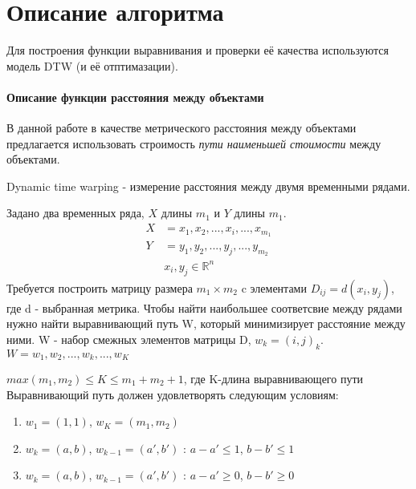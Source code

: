 \documentclass[12pt,twoside]{article}
\begin{document}
    \section{Описание алгоритма}
        Для построения функции выравнивания и проверки её качества используются модель DTW (и её отптимазации).
    \paragraph{Описание функции расстояния между объектами}
        В данной работе в качестве метрического расстояния между объектами предлагается использовать строимость
        \textit{пути наименьшей стоимости} между объектами.
            
        Dynamic time warping - измерение расстояния между двумя временными рядами.
            
        Задано два временных ряда, $X$ длины $m_1$ и $Y$ длины $m_1$.
            \begin{align*}
                X &= x_1,x_2, ..., x_i, ..., x_{m_1} \\
                Y &= y_1,y_2, ..., y_j, ..., y_{m_2} \\
                & x_i, y_j \in \mathbb{R}^n
            \end{align*}
        Требуется построить матрицу размера $m_1\times m_2$ c элементами $D_{ij}=d(x_i, y_j)$, где d - выбранная метрика.
        Чтобы найти наибольшее соответсвие между рядами нужно найти выравнивающий путь W, который минимизирует расстояние между ними.
        W - набор смежных элементов матрицы D, $w_k = (i, j)_k$.
            $W = w_1,w_2, ..., w_k, ..., w_K $

            $max(m_1, m_2)\leq K \leq m_1 + m_2 + 1$, где K-длина выравнивающего пути
        Выравнивающий путь должен удовлетворять следующим условиям:
            \begin{enumerate}
                \item $w_1=(1,1)$, $w_K=(m_1, m_2)$
                \item $w_k = (a, b)$, $w_{k-1}=(a', b')$ : $a-a' \leq 1$, $b-b' \leq 1$ 
                \item $w_k = (a, b)$, $w_{k-1}=(a', b')$ : $a-a' \geq 0$, $b-b'\geq 0$
            \end{enumerate}
\end{document}
